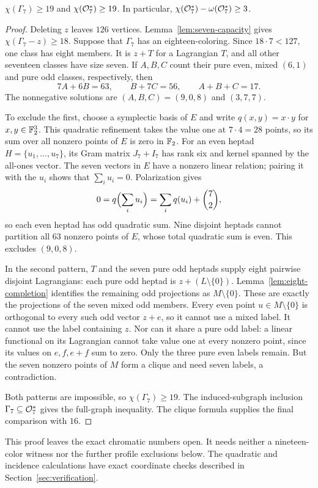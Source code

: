 \begin{theorem}\label{thm:seven-lower}
$\chi(\Gamma_7)\geq19$ and $\chi(\mathcal O_7^*)\geq19$.
In particular, $\chi(\mathcal O_7^*)-\omega(\mathcal O_7^*)\geq3$.
\end{theorem}
\begin{proof}
Deleting $z$ leaves $126$ vertices. Lemma~\ref{lem:seven-capacity}
gives $\chi(\Gamma_7-z)\geq18$. Suppose that $\Gamma_7$ has an
eighteen-coloring. Since $18\cdot7<127$, one class has eight
members. It is $z+T$ for a Lagrangian $T$, and all other seventeen
classes have size seven. If $A,B,C$ count their pure even,
mixed $(6,1)$ and pure odd classes, respectively, then
\[
7A+6B=63,\qquad B+7C=56,\qquad A+B+C=17.
\]
The nonnegative solutions are $(A,B,C)=(9,0,8)$ and $(3,7,7)$.

To exclude the first, choose a symplectic basis of $E$ and write
$q(x,y)=x\cdot y$ for $x,y\in\mathbb F_2^3$. This quadratic refinement
takes the value one at $7\cdot4=28$ points, so its sum over all
nonzero points of $E$ is zero in $\mathbb F_2$.
For an even heptad $H=\{u_1,\ldots,u_7\}$, its Gram matrix
$J_7+I_7$ has rank six and kernel spanned by the all-ones vector.
The seven vectors in $E$ have a nonzero linear relation; pairing
it with the $u_i$ shows that $\sum_i u_i=0$. Polarization gives
\[
0=q\Bigl(\sum_i u_i\Bigr)
 =\sum_i q(u_i)+\binom72,
\]
so each even heptad has odd quadratic sum. Nine disjoint heptads
cannot partition all $63$ nonzero points of $E$, whose total
quadratic sum is even. This excludes $(9,0,8)$.

In the second pattern, $T$ and the seven pure odd heptads supply
eight pairwise disjoint Lagrangians: each pure odd heptad is
$z+(L\setminus\{0\})$. Lemma~\ref{lem:eight-completion} identifies
the remaining odd projections as $M\setminus\{0\}$. These are
exactly the projections of the seven mixed odd members.
Every even point $u\in M\setminus\{0\}$ is orthogonal to every
such odd vector $z+e$, so it cannot use a mixed label. It cannot
use the label containing $z$. Nor can it share a pure odd label:
a linear functional on its Lagrangian cannot take value one
at every nonzero point, since its values on $e,f,e+f$ sum to zero.
Only the three pure even labels remain. But the seven nonzero points of
$M$ form a clique and need seven labels, a contradiction.

Both patterns are impossible, so $\chi(\Gamma_7)\geq19$.
The induced-subgraph inclusion $\Gamma_7\subseteq\mathcal O_7^*$ gives
the full-graph inequality. The clique formula supplies the final
comparison with $16$.
\end{proof}

This proof leaves the exact chromatic numbers open. It needs neither
a nineteen-color witness nor the further profile exclusions below.
The quadratic and incidence calculations have exact coordinate
checks described in Section~\ref{sec:verification}.

